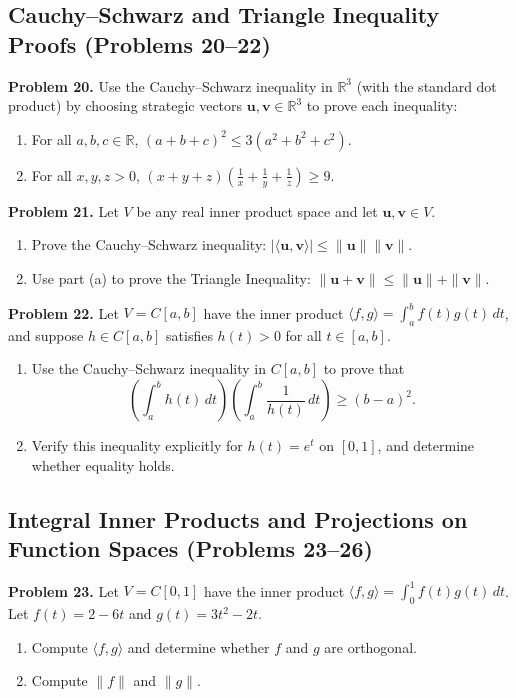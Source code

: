\documentclass[11pt, letterpaper]{article}
\theoremstyle{definition}
\theoremstyle{remark}
\begin{document}
\subsection{Cauchy--Schwarz and Triangle Inequality Proofs (Problems 20--22)}

\textbf{Problem 20.} Use the Cauchy--Schwarz inequality in $\mathbb{R}^3$ (with the standard dot product) by choosing strategic vectors $\mathbf{u}, \mathbf{v} \in \mathbb{R}^3$ to prove each inequality:
\begin{enumerate}[label=(\alph*)]
    \item For all $a, b, c \in \mathbb{R}$, $(a + b + c)^2 \le 3(a^2 + b^2 + c^2)$.
    \item For all $x, y, z > 0$, $(x + y + z)\left(\frac{1}{x} + \frac{1}{y} + \frac{1}{z}\right) \ge 9$.
\end{enumerate}

\textbf{Problem 21.} Let $V$ be any real inner product space and let $\mathbf{u}, \mathbf{v} \in V$.
\begin{enumerate}[label=(\alph*)]
    \item Prove the Cauchy--Schwarz inequality: $|\langle \mathbf{u}, \mathbf{v} \rangle| \le \|\mathbf{u}\|\|\mathbf{v}\|$.
    \item Use part (a) to prove the Triangle Inequality: $\|\mathbf{u} + \mathbf{v}\| \le \|\mathbf{u}\| + \|\mathbf{v}\|$.
\end{enumerate}

\textbf{Problem 22.} Let $V = C[a, b]$ have the inner product $\langle f, g \rangle = \int_a^b f(t)g(t)\,dt$, and suppose $h \in C[a, b]$ satisfies $h(t) > 0$ for all $t \in [a, b]$.
\begin{enumerate}[label=(\alph*)]
    \item Use the Cauchy--Schwarz inequality in $C[a, b]$ to prove that
    \[
    \left(\int_a^b h(t)\,dt\right)\left(\int_a^b \frac{1}{h(t)}\,dt\right) \ge (b - a)^2.
    \]
    \item Verify this inequality explicitly for $h(t) = e^t$ on $[0, 1]$, and determine whether equality holds.
\end{enumerate}

\subsection{Integral Inner Products and Projections on Function Spaces (Problems 23--26)}

\textbf{Problem 23.} Let $V = C[0, 1]$ have the inner product $\langle f, g \rangle = \int_0^1 f(t)g(t)\,dt$. Let $f(t) = 2 - 6t$ and $g(t) = 3t^2 - 2t$.
\begin{enumerate}[label=(\alph*)]
    \item Compute $\langle f, g \rangle$ and determine whether $f$ and $g$ are orthogonal.
    \item Compute $\|f\|$ and $\|g\|$.
\end{enumerate}
\end{document}
